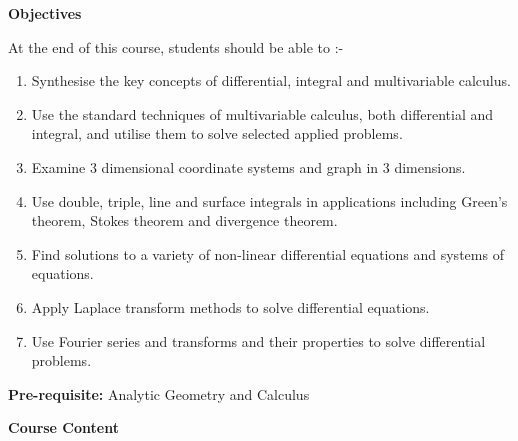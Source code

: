 \documentclass[11pt,a4paper]{article}
\theoremstyle{definition}
\begin{document}
\textbf{Objectives}


At the end of this course, students should be able to :-
\begin{enumerate}
\item Synthesise the key concepts of differential, integral and multivariable calculus.
\item Use the standard techniques of multivariable calculus, both differential and integral, and utilise them to solve selected applied problems.
\item Examine 3 dimensional coordinate systems and graph in 3 dimensions.
\item Use double, triple, line and surface integrals in applications including Green's theorem, Stokes theorem and divergence theorem.
\item Find solutions to a variety of non-linear differential equations and systems of equations.
\item Apply Laplace transform methods to solve differential equations.
\item Use Fourier series and transforms and their properties to solve differential problems.
\end{enumerate}

\textbf{Pre-requisite:} Analytic Geometry and Calculus


\textbf{Course Content}
\end{document}

